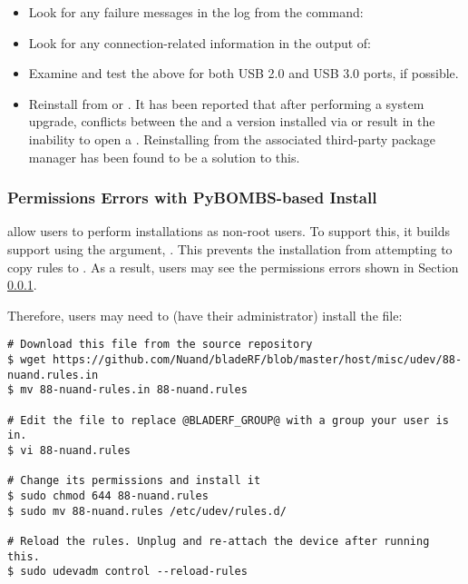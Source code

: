 \begin{itemize}
    \item Look for any failure messages in the log from the command:\\
      \item Look for any connection-related information in the output of: 
    \item Examine and test the above for both USB 2.0 and USB 3.0 ports, if possible.
    \item Reinstall \libusb from \macports or \brew. It has been reported that after
        performing a system upgrade, conflicts between the \osx \libusb and a version
        installed via \macports or \brew result in the inability to open a \bladerf.
        Reinstalling \libusb from the associated third-party package manager has
        been found to be a solution to this.
\end{itemize}

\subsubsection{Permissions Errors with PyBOMBS-based Install}\label{sec:open-linux}
\pybombs \cite{PYBOMBS} allow users to perform installations as non-root users.
To support this, it builds \bladerf support using the \cmake argument,
.  This prevents the installation from
attempting to copy  rules to .  As a
result, users may see the permissions errors
shown in Section \ref{sec:open-linux}.

Therefore, \pybombs users may need to (have their administrator) install the
 \cite{BLADERF_UDEV} file:

\begin{lstlisting}[style=numbered-snippet, caption=Manually installing udev rules]
# Download this file from the source repository
$ wget https://github.com/Nuand/bladeRF/blob/master/host/misc/udev/88-nuand.rules.in
$ mv 88-nuand-rules.in 88-nuand.rules

# Edit the file to replace @BLADERF_GROUP@ with a group your user is in.
$ vi 88-nuand.rules

# Change its permissions and install it
$ sudo chmod 644 88-nuand.rules
$ sudo mv 88-nuand.rules /etc/udev/rules.d/

# Reload the rules. Unplug and re-attach the device after running this.
$ sudo udevadm control --reload-rules
\end{lstlisting}


